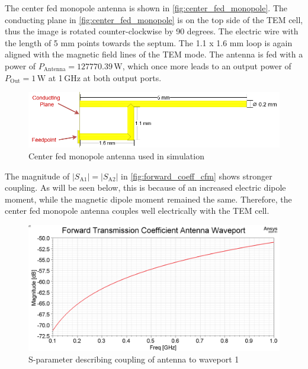 The center fed monopole antenna is shown in \autoref{fig:center_fed_monopole}. The conducting plane in \autoref{fig:center_fed_monopole} is on the top side of the TEM cell, thus the image is rotated counter-clockwise by 90 degrees. The electric wire with the length of 5 mm points towards the septum. The 1.1 x 1.6 mm loop is again aligned with the magnetic field lines of the TEM mode. The antenna is fed with a power of $P_\mathrm{Antenna}=127770.39\,\mathrm{W}$, which once more leads to an output power of $P_\mathrm{Out}=1\,\mathrm{W}$ at 1\,GHz at both output ports. 

\begin{figure}[h]
    \centering
    \includegraphics[width=0.75\linewidth]{Documentation//content//30_simulations//img/center_fed_monopole.png}
    \caption{Center fed monopole antenna used in simulation}
    \label{fig:center_fed_monopole}
\end{figure}

The magnitude of $|S_\mathrm{A1}|=|S_\mathrm{A2}|$ in \autoref{fig:forward_coeff_cfm} shows stronger coupling. As will be seen below, this is because of an increased electric dipole moment, while the magnetic dipole moment remained the same. Therefore, the center fed monopole antenna couples well electrically with the TEM cell.

\begin{figure}[h]
    \centering
    \includegraphics[width=1\linewidth]{Documentation//content//30_simulations//img/forward_coeff_cfm.png}
    \caption{S-parameter describing coupling of antenna to waveport 1}
    \label{fig:forward_coeff_cfm}
\end{figure}

